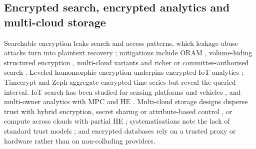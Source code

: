 \documentclass[a4paper,fleqn]{cas-sc}
\begin{document}
\subsection{Encrypted search, encrypted analytics and multi-cloud storage}
Searchable encryption leaks search and access patterns, which leakage-abuse
attacks turn into plaintext recovery
\citep{islam2012access,cash2015leakage,grubbs2017leakage}; mitigations include
ORAM \citep{goldreich1996software}, volume-hiding structured encryption
\citep{kamara2019computationally,patel2019mitigating}, multi-cloud variants
\citep{xu2021privacy,xu2023symmetric} and richer or committee-authorised
search \citep{zhang2024secure,yang2023dynamic,du2022lightweight}. Leveled
homomorphic encryption \citep{fan2012somewhat,cryptoeprint:2016/421} underpins
encrypted IoT analytics \citep{halder2022enabling,kamble2024homomorphic};
Timecrypt \citep{timecrypt} and Zeph \citep{zeph} aggregate encrypted time
series but reveal the queried interval. IoT search has been studied for sensing
platforms \citep{xu2019achieving} and vehicles \citep{wu2024distributed}, and
multi-owner analytics with MPC and HE \citep{verma2025secure}. Multi-cloud
storage designs disperse trust with hybrid encryption, secret sharing or
attribute-based control \citep{bharot2025cloudlock,muthuvel2026design}, or
compute across clouds with partial HE \citep{wang2020shamc}; systematisations
note the lack of standard trust models \citep{cryptoeprint:2026/207}; and
encrypted databases \citep{poddar2019arx,crooks2018obladi,dauterman2021snoopy}
rely on a trusted proxy or hardware rather than on non-colluding providers.
\end{document}

